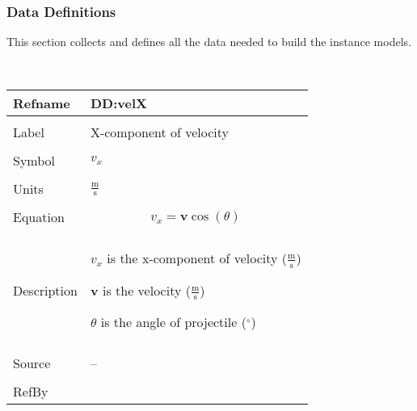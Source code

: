 \documentclass[12pt]{article}
\begin{document}
\subsubsection{Data Definitions}
\label{Sec:DDs}
This section collects and defines all the data needed to build the instance models.
\par~

\noindent \begin{minipage}{\textwidth}
\begin{tabular}{p{} p{}}
\toprule \textbf{Refname} & \textbf{DD:velX}
\label{DD:velX}
\\ \midrule \\
Label & X-component of velocity
\\ \midrule \\
Symbol & ${v_{x}}$
\\ \midrule \\
Units & $\frac{\text{m}}{\text{s}}$
\\ \midrule \\
Equation & \begin{displaymath}
           {v_{x}}=\mathbf{v} \cos\left(θ\right)
           \end{displaymath}
\\ \midrule \\
Description & \begin{symbDescription}
              \item{${v_{x}}$ is the x-component of velocity ($\frac{\text{m}}{\text{s}}$)}
              \item{$\mathbf{v}$ is the velocity ($\frac{\text{m}}{\text{s}}$)}
              \item{$θ$ is the angle of projectile (${}^{\circ}$)}
              \end{symbDescription}
\\ \midrule \\
Source & --
\\ \midrule \\
RefBy & 
\\ \bottomrule \end{tabular}
\end{minipage}
\par~
\end{document}
